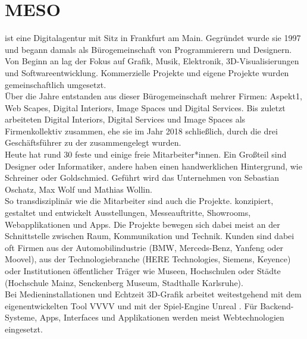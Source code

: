 \section{MESO}
\label{sec:meso}

\mesoFull{} ist eine Digitalagentur mit Sitz in Frankfurt am Main.
Gegründet wurde sie 1997 und begann damals als Bürogemeinschaft von Programmierern
und Designern. Von Beginn an lag der Fokus auf Grafik, Musik, Elektronik, 3D-Visualisierungen
und Softwareentwicklung. Kommerzielle Projekte und eigene Projekte wurden gemeinschaftlich
umgesetzt.\\

Über die Jahre entstanden aus dieser Bürogemeinschaft mehrer Firmen: Aspekt1, \meso{} Web Scapes, \meso{}
Digital Interiors, \meso{} Image Spaces und \meso{} Digital Services. Bis zuletzt arbeiteten 
\meso{} Digital Interiors, \meso{} Digital Services und \meso{} Image Spaces als Firmenkollektiv zusammen, 
ehe sie im Jahr 2018 schließlich, durch die drei Geschäftsführer zu der \mesoFull{} zusammengelegt
wurden.\\
Heute hat \meso{} rund 30 feste und einige freie Mitarbeiter*innen. Ein Großteil sind Designer oder Informatiker, 
andere haben einen handwerklichen Hintergrund, wie Schreiner oder Goldschmied. 
Geführt wird das Unternehmen von Sebastian Oschatz, Max Wolf und Mathias Wollin.\\
So transdisziplinär wie die Mitarbeiter sind auch die Projekte. \meso{} konzipiert, gestaltet und entwickelt
Ausstellungen, Messeauftritte, Showrooms, Webapplikationen und Apps. Die Projekte bewegen sich dabei meist an der
Schnittstelle zwischen Raum, Kommunikation und Technik. Kunden sind dabei oft Firmen aus der
Automobilindustrie (BMW, Merceds-Benz, Yanfeng oder Moovel), aus der Technologiebranche (HERE Technologies,
Siemens, Keyence) oder Institutionen öffentlicher Träger wie Museen, Hochschulen oder Städte (Hochschule Mainz,
Senckenberg Museum, Stadthalle Karlsruhe).\\

Bei Medieninstallationen und Echtzeit 3D-Grafik arbeitet \meso{} weitestgehend mit dem eigenentwickelten 
Tool VVVV \cite{vvvv} und mit der Spiel-Engine Unreal \cite{unreal}. Für Backend-Systeme, Apps, Interfaces
und Applikationen werden meist Webtechnologien eingesetzt.
